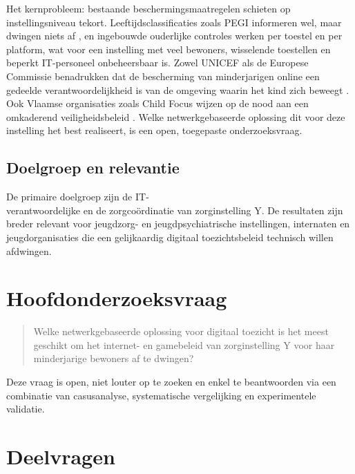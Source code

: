 \documentclass{hogent-article}
\begin{document}
Het kernprobleem: bestaande beschermingsmaatregelen schieten op instellingsniveau tekort. Leeftijdsclassificaties zoals PEGI informeren wel, maar dwingen niets af \autocite{PEGI2026}, en ingebouwde ouderlijke controles werken per toestel en per platform, wat voor een instelling met veel bewoners, wisselende toestellen en beperkt IT-personeel onbeheersbaar is. Zowel UNICEF als de Europese Commissie benadrukken dat de bescherming van minderjarigen online een gedeelde verantwoordelijkheid is van de omgeving waarin het kind zich beweegt \autocite{UNICEF2024, EuropeanCommission2022}. Ook Vlaamse organisaties zoals Child Focus wijzen op de nood aan een omkaderend veiligheidsbeleid \autocite{ChildFocus2026}. Welke netwerkgebaseerde oplossing dit voor deze instelling het best realiseert, is een open, toegepaste onderzoeksvraag.

\subsection{Doelgroep en relevantie}
De primaire doelgroep zijn de IT- \\ verantwoordelijke en de zorgcoördinatie van zorginstelling Y. De resultaten zijn breder relevant voor jeugdzorg- en jeugdpsychiatrische instellingen, internaten en jeugdorganisaties die een gelijkaardig digitaal toezichtsbeleid technisch willen afdwingen.

\section{Hoofdonderzoeksvraag}
\begin{quote}
    Welke netwerkgebaseerde oplossing voor digitaal toezicht is het meest geschikt om het internet- en gamebeleid van zorginstelling Y voor haar minderjarige bewoners af te dwingen?
\end{quote}
Deze vraag is open, niet louter op te zoeken en enkel te beantwoorden via een combinatie van casusanalyse, systematische vergelijking en experimentele validatie.

\section{Deelvragen}
\end{document}
